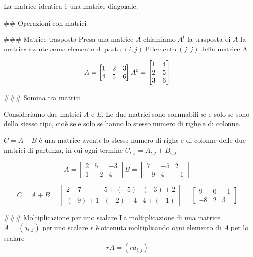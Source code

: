 La matrice identica è una matrice diagonale.


## Operazioni con matrici

### Matrice trasposta
Presa una matrice $A$ chiamiamo $A^t$ la trasposta di $A$ la matrice avente come elemento di posto $(i, j)$ l’elemento $(j, j)$ della matrice A.

$$A =
\begin{bmatrix}
    1 & 2 & 3\\
    4 & 5 & 6
\end{bmatrix}

\\

A^t = \begin{bmatrix}
    1 & 4 \\
    2 & 5 \\
    3 & 6
\end{bmatrix}
$$

### Somma tra matrici

Consideriamo due matrici $A$ e $B$. Le due matrici sono sommabili se e solo se sono dello stesso tipo, cioè se e solo se hanno lo stesso numero di righe e di colonne. 

$C=A+B$ è una matrice avente lo stesso numero di righe e di colonne delle due matrici di partenza, in cui ogni termine $C_{i,j}=A_{i,j}+B_{i,j}$.



 
$$
A = \begin{bmatrix} 
    2 & 5 & -3 \\
    1 & -2 & 4  
\end{bmatrix}

B = \begin{bmatrix} 
    7 & -5 & 2 \\
    -9 & 4 & -1  
    \end{bmatrix}
$$

$$
C = A+B = \begin{bmatrix} 
    2+7 & 5+(-5) & (-3)+2 \\
    (-9)+1 & (-2)+4 & 4+(-1)  
    \end{bmatrix}
    =
    \begin{bmatrix} 
    9 & 0 & -1 \\
    -8 & 2 & 3  
    \end{bmatrix}
$$

### Moltiplicazione per uno scalare
La moltiplicazione di una matrice $A=(a_{i,j})$ per uno scalare $r$ è ottenuta moltiplicando ogni elemento di $A$ per lo scalare:
$$ rA = (ra_{i,j}) $$

